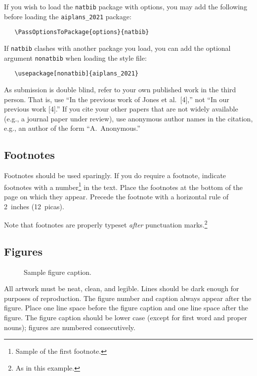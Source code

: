\documentclass{article}
\begin{document}
  If you wish to load the \verb+natbib+ package with options, you may add the
  following before loading the \verb+aiplans_2021+ package:
  \begin{verbatim}
   \PassOptionsToPackage{options}{natbib}
  \end{verbatim}

  If \verb+natbib+ clashes with another package you load, you can add the optional
  argument \verb+nonatbib+ when loading the style file:
  \begin{verbatim}
   \usepackage[nonatbib]{aiplans_2021}
  \end{verbatim}

  As submission is double blind, refer to your own published work in the third
  person. That is, use ``In the previous work of Jones et al.\ [4],'' not ``In our
  previous work [4].'' If you cite your other papers that are not widely available
  (e.g., a journal paper under review), use anonymous author names in the
  citation, e.g., an author of the form ``A.\ Anonymous.''

  \subsection{Footnotes}

  Footnotes should be used sparingly.  If you do require a footnote, indicate
  footnotes with a number\footnote{Sample of the first footnote.} in the
  text. Place the footnotes at the bottom of the page on which they appear.
  Precede the footnote with a horizontal rule of 2~inches (12~picas).

  Note that footnotes are properly typeset \emph{after} punctuation
  marks.\footnote{As in this example.}

  \subsection{Figures}

  \begin{figure}
    \centering
    \fbox{\rule[-.5cm]{0cm}{4cm} \rule[-.5cm]{4cm}{0cm}}
    \caption{Sample figure caption.}
  \end{figure}

  All artwork must be neat, clean, and legible. Lines should be dark enough for
  purposes of reproduction. The figure number and caption always appear after the
  figure. Place one line space before the figure caption and one line space after
  the figure. The figure caption should be lower case (except for first word and
  proper nouns); figures are numbered consecutively.
\end{document}
